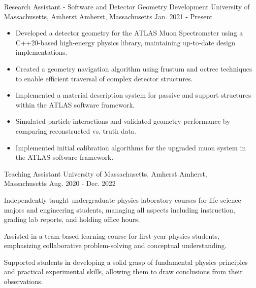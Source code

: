 \begin{cventries}
\cventry
  {Research Assistant - Software and Detector Geometry Development} 
  {University of Massachusetts, Amherst} 
  {Amherst, Massachusetts} 
  {Jan. 2021 - Present} 
  {
    \begin{itemize}
      \item {Developed a detector geometry for the ATLAS Muon Spectrometer using a C++20-based high-energy physics library, maintaining up-to-date design implementations.}
      \item {Created a geometry navigation algorithm using frustum and octree techniques to enable efficient traversal of complex detector structures.}
      \item {Implemented a material description system for passive and support structures within the ATLAS software framework.}
      \item {Simulated particle interactions and validated geometry performance by comparing reconstructed vs. truth data.}
      \item {Implemented initial calibration algorithms for the upgraded muon system in the ATLAS software framework.}
    \end{itemize}
  }

  \cventry
    {Teaching Assistant} %
    {University of Massachusetts, Amherst} %
    {Amherst, Massachusetts} %
    {Aug. 2020 - Dec. 2022} %
    {
      \begin{cvitems}
        \item {Independently taught undergraduate physics laboratory courses for life science majors and engineering students, managing all aspects including instruction, grading lab reports, and holding office hours.}
        \item {Assisted in a team-based learning course for first-year physics students, emphasizing collaborative problem-solving and conceptual understanding.}
        \item {Supported students in developing a solid grasp of fundamental physics principles and practical experimental skills, allowing them to draw conclusions from their observations.}
      \end{cvitems}
    }

\end{cventries}



